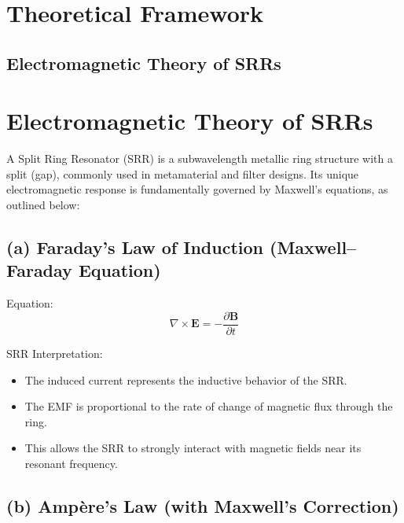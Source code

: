\documentclass[conference]{IEEEtran}
\begin{document}
\section{Theoretical Framework}

\subsection{Electromagnetic Theory of SRRs}
\section*{Electromagnetic Theory of SRRs}

A Split Ring Resonator (SRR) is a subwavelength metallic ring structure with a split (gap), commonly used in metamaterial and filter designs. Its unique electromagnetic response is fundamentally governed by Maxwell’s equations, as outlined below:

\subsection*{(a) Faraday’s Law of Induction (Maxwell–Faraday Equation)}

Equation:
\[
\nabla \times \mathbf{E} = -\frac{\partial \mathbf{B}}{\partial t}
\]


SRR Interpretation:
\begin{itemize}
    \item The induced current represents the inductive behavior of the SRR.
    \item The EMF is proportional to the rate of change of magnetic flux through the ring.
    \item This allows the SRR to strongly interact with magnetic fields near its resonant frequency.
\end{itemize}

\subsection*{(b) Ampère’s Law (with Maxwell’s Correction)}
\end{document}
